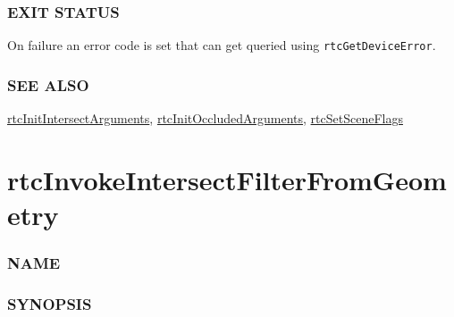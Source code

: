 \subsubsection{EXIT STATUS}\label{exit-status}

On failure an error code is set that can get queried using
\texttt{rtcGetDeviceError}.

\subsubsection{SEE ALSO}\label{see-also}

\hyperref[rtcinitintersectarguments]{rtcInitIntersectArguments},
\hyperref[rtcinitoccludedarguments]{rtcInitOccludedArguments},
\hyperref[rtcsetsceneflags]{rtcSetSceneFlags}

\pagebreak

\section{rtcInvokeIntersectFilterFromGeometry}\label{rtcinvokeintersectfilterfromgeometry}

\subsubsection{NAME}\label{name}

\begin{Shaded}
\begin{Highlighting}[]
\OperatorTok{{-}}
\end{Highlighting}
\end{Shaded}

\subsubsection{SYNOPSIS}\label{synopsis}

\begin{Shaded}
\begin{Highlighting}[]

\OperatorTok{(}
   \OperatorTok{*}\OperatorTok{,}
   \OperatorTok{*}
\OperatorTok{);}
\end{Highlighting}
\end{Shaded}

